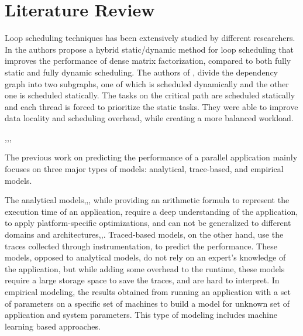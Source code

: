 \section{Literature Review}

Loop scheduling techniques has been extensively studied by different researchers. In \cite{donfack2012hybrid} the authors propose a hybrid static/dynamic method for loop scheduling that improves the performance of dense matrix factorization, compared to both fully static and fully dynamic scheduling. The authors of \cite{donfack2012hybrid}, divide the dependency graph into two subgraphs, one of which is scheduled dynamically and the other one is scheduled statically. The tasks on the critical path are scheduled statically and each thread is forced to prioritize the static tasks\cite{donfack2012hybrid}. They were able to improve data locality and scheduling overhead, while creating a more balanced workload. 

\cite{xue2007locality}
 \cite{tang1986processor},\cite{polychronopoulos1987guided},\cite{hummel1992factoring},\cite{kruskal1985allocating}
	




The previous work on predicting the performance of a parallel application mainly focuses on three major types of models: analytical, trace-based, and empirical models\cite{malakar2018benchmarking}. 

The analytical models\cite{blagojevic2008modeling},\cite{kerbyson2001predictive},\cite{valiant1990bridging}, while providing an arithmetic formula to represent the execution time of an application, require a deep understanding of the application, to apply platform-specific optimizations, and can not be generalized to different domains and architectures\cite{lee2007methods},\cite{sun2017automated},\cite{pllana2007performance}.
Traced-based models, on the other hand, use the traces collected through instrumentation, to predict the performance. These models, opposed to analytical models, do not rely on an expert's knowledge of the application, but while adding some overhead to the runtime, these models require a large storage space to save the traces, and are hard to interpret\cite{sun2017automated}.   
In empirical modeling, the results obtained from running an application with a set of parameters on a specific set of machines to build a model for unknown set of application and system parameters\cite{malakar2018benchmarking}. This type of modeling includes machine learning based approaches.

